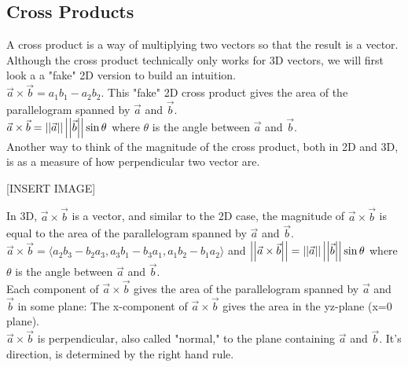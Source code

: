 \subsection{Cross Products}
\noindent
A cross product is a way of multiplying two vectors so that the result is a vector. Although the cross product technically only works for 3D vectors, we will first look a a "fake" 2D version to build an intuition.\\
$\vec{a}\times\vec{b}=a_1b_1-a_2b_2$. This "fake" 2D cross product gives the area of the parallelogram spanned by $\vec{a}$ and $\vec{b}$.\\
$\vec{a}\times\vec{b}=\left|\left|\vec{a}\right|\right|\left|\left|\vec{b}\right|\right|\sin{\theta}$ where $\theta$ is the angle between $\vec{a}$ and $\vec{b}$.\\
Another way to think of the magnitude of the cross product, both in 2D and 3D, is as a measure of how perpendicular two vector are.

[INSERT IMAGE]

\noindent
In 3D, $\vec{a}\times\vec{b}$ is a vector, and similar to the 2D case, the magnitude of $\vec{a}\times\vec{b}$ is equal to the area of the parallelogram spanned by $\vec{a}$ and $\vec{b}$.\\
$\vec{a}\times\vec{b}=\langle a_2b_3-b_2a_3,a_3b_1-b_3a_1,a_1b_2-b_1a_2 \rangle$ and $\left|\left|\vec{a}\times\vec{b}\right|\right|=\left|\left|\vec{a}\right|\right|\left|\left|\vec{b}\right|\right|\sin{\theta}$ where $\theta$ is the angle between $\vec{a}$ and $\vec{b}$.\\
Each component of $\vec{a}\times\vec{b}$ gives the area of the parallelogram spanned by $\vec{a}$ and $\vec{b}$ in some plane: The x-component of $\vec{a}\times\vec{b}$ gives the area in the yz-plane (x=0 plane).\\
$\vec{a}\times\vec{b}$ is perpendicular, also called "normal," to the plane containing $\vec{a}$ and $\vec{b}$. It's direction, is determined by the right hand rule.\\

